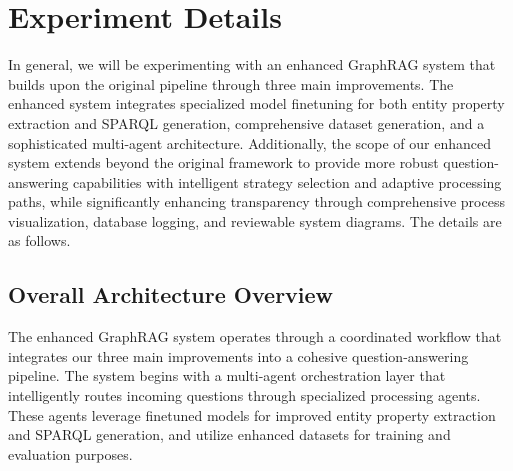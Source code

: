 



\section{Experiment Details}
\label{exp-detail}
In general, we will be experimenting with an enhanced GraphRAG system that builds upon the original pipeline through three main improvements. The enhanced system integrates specialized model finetuning for both entity property extraction and SPARQL generation, comprehensive dataset generation, and a sophisticated multi-agent architecture. Additionally, the scope of our enhanced system extends beyond the original framework to provide more robust question-answering capabilities with intelligent strategy selection and adaptive processing paths, while significantly enhancing transparency through comprehensive process visualization, database logging, and reviewable system diagrams. The details are as follows.

\subsection{Overall Architecture Overview}
The enhanced GraphRAG system operates through a coordinated workflow that integrates our three main improvements into a cohesive question-answering pipeline. The system begins with a multi-agent orchestration layer that intelligently routes incoming questions through specialized processing agents. These agents leverage finetuned models for improved entity property extraction and SPARQL generation, and utilize enhanced datasets for training and evaluation purposes.

